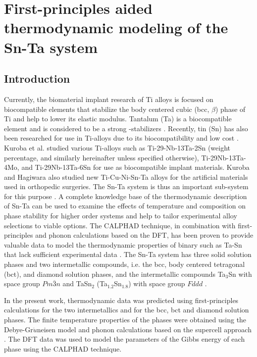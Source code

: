 \chapter{First-principles aided thermodynamic modeling of the Sn-Ta system}

\section{Introduction}

Currently, the biomaterial implant research of Ti alloys is focused on biocompatible elements that stabilize the body centered cubic (bcc, $\beta$) phase of Ti and help to lower its elastic modulus. Tantalum (Ta) is a biocompatible element and is considered to be a strong -stabilizers \cite{Brailovski2011b}. Recently, tin (Sn) has also been researched for use in Ti-alloys due to its biocompatibility and low cost \cite{Niinomi2012}. Kuroba et al. \cite{Kuroda1998} studied various Ti-alloys such as Ti-29-Nb-13Ta-2Sn (weight percentage, and similarly hereinafter unless specified otherwise), Ti-29Nb-13Ta-4Mo, and Ti-29Nb-13Ta-6Sn for use as biocompatible implant materials. Kuroba and Hagiwara \cite{He2004} also studied new Ti-Cu-Ni-Sn-Ta alloys for the artificial materials used in orthopedic surgeries. The Sn-Ta system is thus an important sub-system for this purpose \cite{He2006}.  A complete knowledge base of the thermodynamic description of Sn-Ta can be used to examine the effects of temperature and composition on phase stability for higher order systems and help to tailor experimental alloy selections to viable options. The CALPHAD technique, in combination with first-principles and phonon calculations based on the DFT, has been proven to provide valuable data to model the thermodynamic properties of binary such as Ta-Sn that lack sufficient experimental data \cite{Liu2009}. The Sn-Ta system has three solid solution phases and two intermetallic compounds, i.e. the bcc, body centered tetragonal (bct), and diamond solution phases, and the intermetallic compounds Ta$_{3}$Sn with space group $Pm\overline{3}n$ and TaSn$_{2}$ (Ta$_{1.2}$Sn$_{1.8}$) with space group $Fddd$ \cite{Okamoto2003}.

 In the present work, thermodynamic data was predicted using first-principles calculations for the two intermetallics and for the bcc, bct and diamond solution phases. The finite temperature properties of the phases were obtained using the Debye-Gr$\ddot{u}$neisen model \cite{Shang2010} and phonon calculations based on the supercell approach \cite{Wang2012}.  The DFT data was used to model the parameters of the Gibbs energy of each phase using the CALPHAD technique.

